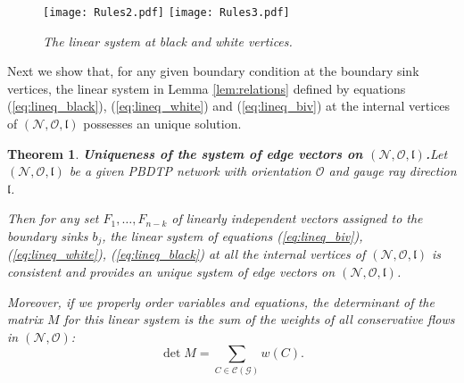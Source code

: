 \documentclass[11pt]{amsart}
\theoremstyle{plain}
\numberwithin{equation}{section}
\newtheorem{theorem}{Theorem}[subsection]
\begin{document}
\begin{figure}%
  \centering
	{\texttt{[image: Rules2.pdf]}}
	\hfill
	{\texttt{[image: Rules3.pdf]}}
  \caption{\small{\sl The linear system at black and white vertices.}}\label{fig:rules23}
\end{figure}

Next we show that, for any given boundary condition at the boundary sink vertices, the linear system in Lemma \ref{lem:relations} defined by equations (\ref{eq:lineq_black}), (\ref{eq:lineq_white}) and (\ref{eq:lineq_biv}) at the internal vertices of $(\mathcal N, \mathcal O, \mathfrak{l})$ possesses an unique solution.

\begin{theorem}\textbf{Uniqueness of the system of edge vectors on $(\mathcal N, \mathcal O, \mathfrak{l})$.}\label{theo:consist}
Let $(\mathcal N, \mathcal O, \mathfrak{l})$ be a given PBDTP network with orientation $\mathcal O$ and gauge ray direction $\mathfrak{l}$. 

Then for any set $F_1,\dots, F_{n-k}$ of linearly independent vectors assigned to the boundary sinks $b_j$, the linear system of equations (\ref{eq:lineq_biv}), (\ref{eq:lineq_white}), (\ref{eq:lineq_black}) at all the internal vertices of $(\mathcal N, \mathcal O, \mathfrak{l})$ is consistent and provides an unique system of edge vectors on 
$(\mathcal N, \mathcal O, \mathfrak{l})$. 

Moreover, if we properly order variables and equations, the determinant of the matrix $M$ for this linear system is the sum of the weights of all conservative flows in $(\mathcal N,\mathcal O)$:
\begin{equation}
\label{eq:tal_den}
\det M = \sum\limits_{C\in {\mathcal C}(\mathcal G)}  w(C).
\end{equation}
\end{theorem}
\end{document}

